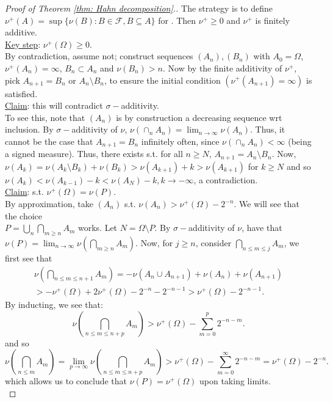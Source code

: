 \documentclass{article}
\begin{document}
\begin{proof}[Proof of Theorem \ref{thm: Hahn decomposition}.]
    The strategy is to define $\nu^+(A)=\sup\{\nu(B):B\in\mathcal{F}, B\subseteq A\}$ for . Then $\nu^+\geq 0$ and $\nu^+$ is finitely additive. \\

    \noindent\underline{Key step}: $\nu^+(\Omega)\geq 0$.\\

    By contradiction, assume not; construct sequences $(A_n), (B_n)$ with $ A_0=\Omega$, $\nu^+(A_n)=\infty$, $B_n\subset A_n$ and $\nu(B_n)>n$. Now by the finite additivity of $\nu^+$, pick $A_{n+1}=B_n$ or $A_n\setminus B_n$, to ensure the initial condition $(\nu^+(A_{n+1})=\infty)$ is satisfied. \\

    \noindent\underline{Claim}: this will contradict $\sigma-$additivity. \\

    To see this, note that $(A_n)$ is by construction a decreasing sequence wrt inclusion. By $\sigma-$additivity of $\nu$, $\nu(\cap_n A_n)= \displaystyle\lim_{n\to\infty}\nu(A_n)$. Thus, it cannot be the case that $A_{n+1}=B_n$ infinitely often, since $\nu(\cap_n A_n)<\infty$ (being a signed measure). Thus, there exists  s.t. for all $n\geq N$, $A_{n+1}=A_n\setminus B_n$. 
    Now, $\nu(A_k)=\nu(A_k \setminus B_k)+\nu(B_k)>\nu(A_{k+1})+k>\nu(A_{k+1})$ for $k\geq N$ and so $\nu(A_k)<\nu(A_{k-1})-k< \nu(A_{N})-k, k\to-\infty$, a contradiction. \\

    \noindent\underline{Claim}: \isthere {} s.t. $\nu^+(\Omega)=\nu(P)$. \\

    By approximation, take $(A_n)$ s.t. $\nu(A_n)>\nu^+(\Omega)-2^{-n}$. We will see that the choice \\$P=\displaystyle\bigcup_n \displaystyle\bigcap_{m\geq n}A_m$ works. Let $N=\Omega\setminus P$. By $\sigma-$additivity of $\nu$, have that $\nu(P)=\displaystyle\lim_{n\to\infty}\nu\left(\bigcap_{m\geq n}A_m\right)$. Now, for $j\geq n$, consider $\displaystyle\bigcap_{n\leq m \leq j}A_m$, we first see that
    $$
    \begin{array}{ll}
    \nu\left(\displaystyle\bigcap_{n\leq m \leq n+1}A_m\right)
    =-\nu(A_n\displaystyle\cup A_{n+1})+\nu(A_n)+\nu(A_{n+1})\\
    >-\nu^+(\Omega)+2\nu^+(\Omega)-2^{-n}-2^{-n-1}>\nu^+(\Omega)-2^{-n-1}.
    \end{array}
    $$
By inducting, we see that:\\
$$
\nu\left(\displaystyle\bigcap_{n\leq m \leq n+p}A_m\right) >\nu^+(\Omega)-\displaystyle\sum_{m=0}^p 2^{-n-m}.
$$
\noindent and so 
$$
\nu\left(\displaystyle\bigcap_{n\leq m }A_m\right) = \displaystyle\lim_{p\to\infty}\nu\left(\displaystyle\bigcap_{n\leq m \leq n+p}A_m\right) > \nu^+(\Omega)-\displaystyle\sum_{m=0}^\infty 2^{-n-m}=\nu^+(\Omega)-2^{-n}.
$$
which allows us to conclude that $\nu(P)=\nu^+(\Omega)$ upon taking limits.\\


\end{proof}
\end{document}
